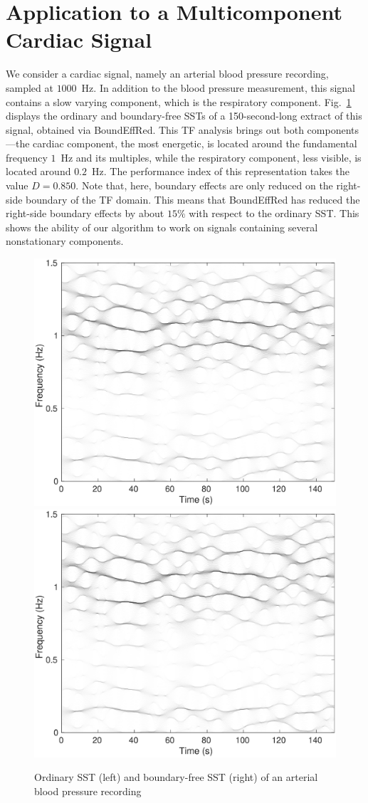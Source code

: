 \documentclass[journal,onecolumn]{IEEEtran}
\begin{document}
{\color{red}
\section{Application to a Multicomponent Cardiac Signal}
We consider a cardiac signal, namely an arterial blood pressure recording, sampled at $1000$~Hz. In addition to the blood pressure measurement, this signal contains a slow varying component, which is the respiratory component. Fig.~\ref{fig:abp} displays the ordinary and boundary-free SSTs of a 150-second-long extract of this signal, obtained via {\sf BoundEffRed}. This TF analysis brings out both components---the cardiac component, the most energetic, is located around the fundamental frequency $1$~Hz and its multiples, while the respiratory component, less visible, is located around $0.2$~Hz. The performance index of this representation takes the value $D=0.850$. Note that, here, boundary effects are only reduced on the right-side boundary of the TF domain. This means that {\sf BoundEffRed} has reduced the right-side boundary effects by about $15\%$ with respect to the ordinary SST. This shows the ability of our algorithm to work on signals containing several nonstationary components.

\begin{figure}
\centering
\includegraphics[width=.48\textwidth]{ABPsst.eps}
\includegraphics[width=.48\textwidth]{ABPberSST.eps}
\caption{Ordinary SST (left) and boundary-free SST (right) of an arterial blood pressure recording}
\label{fig:abp}
\end{figure} 
}




\end{document}
